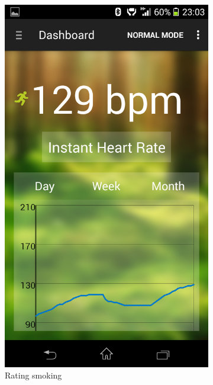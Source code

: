 \begin{figure}
\begin{subfigure}{.24\textwidth}
  \includegraphics[width=.8\linewidth]{img/screenshot/ss7.png}
  \caption{Rating smoking}
\end{subfigure}
\begin{subfigure}{.24\textwidth}
  \centering

\end{subfigure}
\end{figure}
